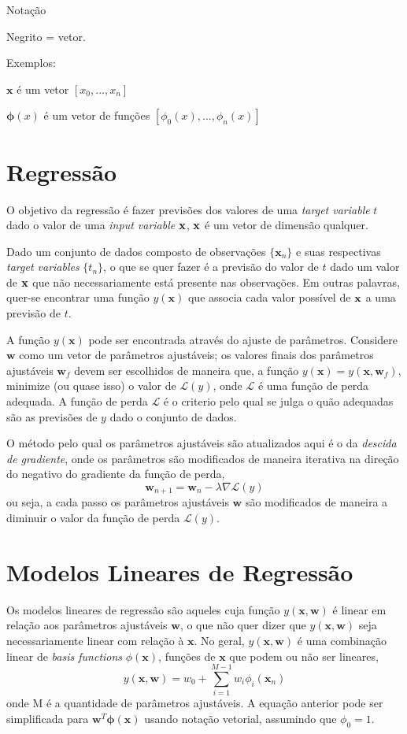 \documentclass{article}
\begin{document}
Notação

Negrito = vetor.

Exemplos:

\(\textbf{x}\) é um vetor \([x_0,...,x_n]\)

\(\boldsymbol{\phi}(x)\) é um vetor de funções \([\phi_0(x),...,\phi_n(x)]\)

\section{Regressão}

O objetivo da regressão é fazer previsões dos valores de uma \emph{target variable} \(t\) dado o valor de uma \emph{input variable} \(\bf x\),
\(\bf x\) é um vetor de dimensão qualquer.

Dado um conjunto de dados composto de observações \( \{ \textbf{x}_n \} \) e suas respectivas
\emph{target variables} \( \{t_n\} \), o que se quer fazer é a previsão do valor de \(t\)
dado um valor de \(\bf x\) que não necessariamente está presente nas observações. Em outras palavras,
quer-se encontrar uma função \( y(\textbf{x}) \) que associa cada valor possível de \(\bf x\) a uma previsão de
\(t\).

A função \( y(\textbf{x}) \) pode ser encontrada através do ajuste de parâmetros. Considere \( \textbf{w} \) como um vetor
de parâmetros ajustáveis; os valores finais dos parâmetros ajustáveis \( \textbf{w}_f \) devem ser escolhidos
de maneira que, a função \( y(\textbf{x}) = y(\textbf{x}, \textbf{w}_f) \), minimize (ou quase isso) o valor de \( \mathcal{L}(y) \), onde
\( \mathcal{L} \) é uma função de perda adequada. A função de perda \( \mathcal{L} \) é o criterio
pelo qual se julga o quão adequadas são as previsões de \(y\) dado o conjunto de dados.

O método pelo qual os parâmetros ajustáveis são atualizados aqui é o da \emph{descida de gradiente}, onde os parâmetros
são modificados de maneira iterativa na direção do negativo do gradiente da função de perda,
\[ \textbf{w}_{n + 1} = \textbf{w}_n - \lambda \nabla \mathcal{L}(y) \]
ou seja, a cada passo os parâmetros ajustáveis \( \textbf{w} \) são modificados de maneira a diminuir o valor da
função de perda \( \mathcal{L}(y) \).

\section{Modelos Lineares de Regressão}

Os modelos lineares de regressão são aqueles cuja função \( y(\textbf{x}, \textbf{w}) \) é linear em relação aos parâmetros
ajustáveis \( \textbf{w} \), o que não quer dizer que \( y(\textbf{x}, \textbf{w}) \) seja necessariamente linear com relação
à \( \textbf{x} \). No geral, \( y(\textbf{x}, \textbf{w}) \) é uma combinação linear de \emph{basis functions}
\( \phi(\textbf{x}) \), funções de \( \textbf{x} \) que podem ou não ser lineares,
\[ y(\textbf{x}, \textbf{w}) = w_0 + \sum_{i=1}^{M-1} w_i \phi_i(\textbf{x}_n) \]
onde M é a quantidade de parâmetros ajustáveis. A equação anterior pode ser simplificada para \( \textbf{w}^T \boldsymbol{\phi}(\textbf{x}) \)
usando notação vetorial, assumindo que \( \phi_0 = 1 \).
\end{document}
